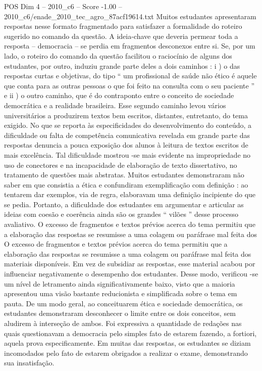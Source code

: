 \begin{textsample}{POS Dim 4 – 2010\_c6 – Score -1.00 – 2010\_c6/enade\_2010\_tec\_agro\_87acf19614.txt}
Muitos estudantes apresentaram respostas nesse formato fragmentado para satisfazer a formalidade do roteiro sugerido no comando da questão.
A ideia-chave que deveria permear toda a resposta – democracia – se perdia em fragmentos desconexos entre si.
Se, por um lado, o roteiro do comando da questão facilitou o raciocínio de alguns dos estudantes, por outro, induziu grande parte deles a dois caminhos : i ) o das respostas curtas e objetivas, do tipo “ um profissional de saúde não ético é aquele que conta para as outras pessoas o que foi feito na consulta com o seu paciente ” e ii ) o outro caminho, que é do contraponto entre o conceito de sociedade democrática e a realidade brasileira.
Esse segundo caminho levou vários universitários a produzirem textos bem escritos, distantes, entretanto, do tema exigido.
No que se reporta às especificidades do desenvolvimento do conteúdo, a dificuldade ou falta de competência comunicativa revelada em grande parte das respostas denuncia a pouca exposição dos alunos à leitura de textos escritos de mais excelência.
Tal dificuldade mostrou -se mais evidente na impropriedade no uso de conectores e na incapacidade de elaboração de texto dissertativo, no tratamento de questões mais abstratas.
Muitos estudantes demonstraram não saber em que consistia a ética e confundiram exemplificação com definição : ao tentarem dar exemplos, via de regra, elaboravam uma definição incipiente do que se pedia.
Portanto, a dificuldade dos estudantes em argumentar e articular as ideias com coesão e coerência ainda são os grandes “ vilões ” desse processo avaliativo.
O excesso de fragmentos e textos prévios acerca do tema permitiu que a elaboração das respostas se resumisse a uma colagem ou paráfrase mal feita dos O excesso de fragmentos e textos prévios acerca do tema permitiu que a elaboração das respostas se resumisse a uma colagem ou paráfrase mal feita dos materiais disponíveis.
Em vez de subsidiar as respostas, esse material acabou por influenciar negativamente o desempenho dos estudantes.
Desse modo, verificou -se um nível de letramento ainda significativamente baixo, visto que a maioria apresentou uma visão bastante reducionista e simplificada sobre o tema em pauta.
De um modo geral, ao conceituarem ética e sociedade democrática, os estudantes demonstraram desconhecer o limite entre os dois conceitos, sem aludirem à interseção de ambos.
Foi expressiva a quantidade de redações nas quais questionavam a democracia pelo simples fato de estarem fazendo, a fortiori, aquela prova especificamente.
Em muitas das respostas, os estudantes se diziam incomodados pelo fato de estarem obrigados a realizar o exame, demonstrando sua insatisfação.

\end{textsample}
